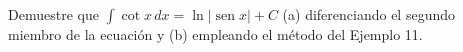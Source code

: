 \item Demuestre que $\int \cot x \, dx = \ln |\operatorname{sen} x| + C$ (a) diferenciando el segundo miembro de la ecuación y (b) empleando el método del Ejemplo 11.
